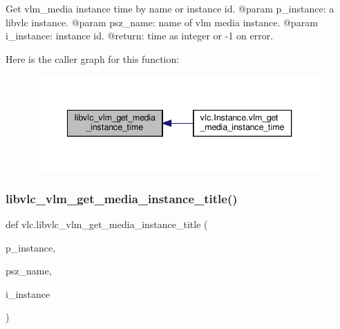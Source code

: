 \begin{DoxyVerb}Get vlm_media instance time by name or instance id.
@param p_instance: a libvlc instance.
@param psz_name: name of vlm media instance.
@param i_instance: instance id.
@return: time as integer or -1 on error.
\end{DoxyVerb}
 Here is the caller graph for this function\+:
\nopagebreak
\begin{figure}[H]
\begin{center}
\leavevmode
\includegraphics[width=340pt]{namespacevlc_a7cc16a54030b527e482741447ba35aef_icgraph}
\end{center}
\end{figure}
\mbox{\label{namespacevlc_aa50fef0c1e8a8a03f23275fca6642a1e}} 
\subsubsection{\texorpdfstring{libvlc\+\_\+vlm\+\_\+get\+\_\+media\+\_\+instance\+\_\+title()}{libvlc\_vlm\_get\_media\_instance\_title()}}
{\footnotesize\ttfamily def vlc.\+libvlc\+\_\+vlm\+\_\+get\+\_\+media\+\_\+instance\+\_\+title (\begin{DoxyParamCaption}\item[{}]{p\+\_\+instance,  }\item[{}]{psz\+\_\+name,  }\item[{}]{i\+\_\+instance }\end{DoxyParamCaption})}

